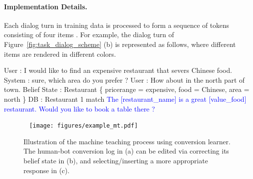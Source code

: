 \documentclass[11pt,a4paper]{article}
\begin{document}
\paragraph{Implementation Details.} 
Each dialog turn in training data is processed to form a sequence of tokens consisting of four items . For example, the dialog turn of Figure~\ref{fig:task_dialog_scheme} (b) is represented as follows, where different items are rendered in different colors.
\begin{tcolorbox}[boxsep=1pt,colframe=white!90!black,colback=black!2!white] \small
    \textcolor{red!60}{User : I would like to find an expensive restaurant that severs Chinese food. System : sure, which area do you prefer ? User :  How about in the north part of town.} 
    \textcolor{mygreen}{ Belief State : Restaurant \{ pricerange = expensive, food = Chinese, area = north \} }
    \textcolor{myyellow}{DB : Restaurant 1 match }
    \textcolor{blue}{The [restaurant\_name] is a great [value\_food] restaurant. Would you like to book a table there ? }
\end{tcolorbox} 

\begin{table}[t!]
    \centering
    \footnotesize
    
    \caption{Dialog corpora. The datasets in the upper block are used for task-grounded pre-training, and the datasets in the lower block are for fine-tuning.}
    \label{table:datasetstatistics}
    \vspace{-5mm}
\end{table}
\begin{figure*}[t!]~\hspace{3mm}
\texttt{[image: figures/example\_mt.pdf]}
\caption{Illustration of the machine teaching process using conversion learner. The human-bot conversion log in (a) can be edited via correcting its belief state in (b), and selecting/inserting a more appropriate response in (c).}
\label{fig:example_mt}
\end{figure*}
 
\end{document}
